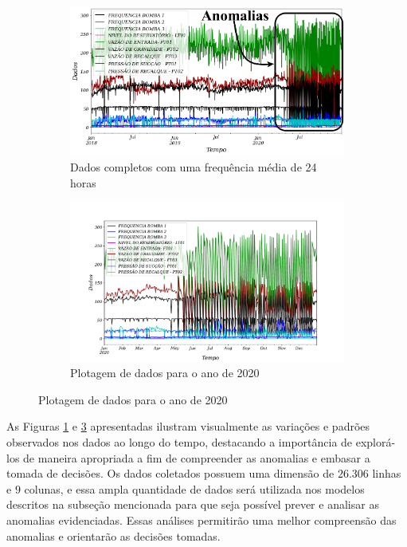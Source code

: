 \begin{figure}[htpb!]
	\centering
	\caption{Detecção de anomalias}
	\begin{subfigure}{0.9\textwidth}	
	\includegraphics[width=\linewidth]{"Introducao/Figuras/dados todos"}	
	\caption{Dados completos com uma frequência média de 24 horas}
	\label{fig:dados-todos}		
	\end{subfigure}
	
	\begin{subfigure}{0.9\textwidth}
	\includegraphics[width=\linewidth]{"Introducao/Figuras/2020 a frente"}
	\caption{Plotagem de dados para o ano de 2020}
	\label{fig:2020-a-frente}
	\end{subfigure}
	
\end{figure}



As Figuras \ref{fig:dados-todos} e \ref{fig:2020-a-frente} apresentadas ilustram visualmente as variações e padrões observados nos dados ao longo do tempo, destacando a importância de explorá-los de maneira apropriada a fim de compreender as anomalias e embasar a tomada de decisões. Os dados coletados possuem uma dimensão de $26.306$ linhas e $9$ colunas, e essa ampla quantidade de dados será utilizada nos modelos descritos na subseção mencionada para que seja possível prever e analisar as anomalias evidenciadas. Essas análises permitirão uma melhor compreensão das anomalias e orientarão as decisões tomadas.






